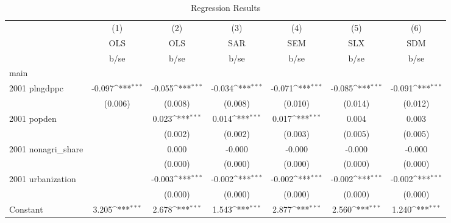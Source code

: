 \begin{table}[htbp]\centering
\def\sym#1{\ifmmode^{#1}\else\(^{#1}\)\fi}
\caption{Regression Results}
\begin{tabular}{l*{6}{c}}
\hline\hline
                    &\multicolumn{1}{c}{(1)}&\multicolumn{1}{c}{(2)}&\multicolumn{1}{c}{(3)}&\multicolumn{1}{c}{(4)}&\multicolumn{1}{c}{(5)}&\multicolumn{1}{c}{(6)}\\
                    &\multicolumn{1}{c}{OLS}&\multicolumn{1}{c}{OLS}&\multicolumn{1}{c}{SAR}&\multicolumn{1}{c}{SEM}&\multicolumn{1}{c}{SLX}&\multicolumn{1}{c}{SDM}\\
                    &        b/se         &        b/se         &        b/se         &        b/se         &        b/se         &        b/se         \\
\hline
main                &                     &                     &                     &                     &                     &                     \\
2001 plngdppc       &      -0.097\sym{***}&      -0.055\sym{***}&      -0.034\sym{***}&      -0.071\sym{***}&      -0.085\sym{***}&      -0.091\sym{***}\\
                    &     (0.006)         &     (0.008)         &     (0.008)         &     (0.010)         &     (0.014)         &     (0.012)         \\
2001 popden         &                     &       0.023\sym{***}&       0.014\sym{***}&       0.017\sym{***}&       0.004         &       0.003         \\
                    &                     &     (0.002)         &     (0.002)         &     (0.003)         &     (0.005)         &     (0.005)         \\
2001 nonagri\_share  &                     &       0.000         &      -0.000         &      -0.000         &      -0.000         &      -0.000         \\
                    &                     &     (0.000)         &     (0.000)         &     (0.000)         &     (0.000)         &     (0.000)         \\
2001 urbanization   &                     &      -0.003\sym{***}&      -0.002\sym{***}&      -0.002\sym{***}&      -0.002\sym{***}&      -0.002\sym{***}\\
                    &                     &     (0.000)         &     (0.000)         &     (0.000)         &     (0.000)         &     (0.000)         \\
Constant            &       3.205\sym{***}&       2.678\sym{***}&       1.543\sym{***}&       2.877\sym{***}&       2.560\sym{***}&       1.240\sym{***}\\

\end{tabular}
\end{table}
